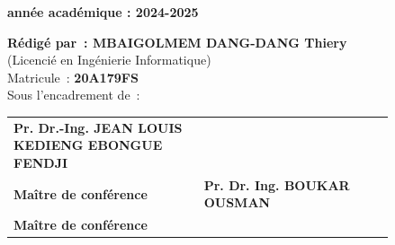 \begin{center}
	\textbf{année académique : 2024-2025}
\end{center}
\vspace{-1cm}

\begin{center}
	{\bfseries Rédigé par~: MBAIGOLMEM DANG-DANG Thiery} \\
	(Licencié en Ingénierie Informatique) \\
	Matricule~: {\bfseries 20A179FS} \\[0.6cm]
	Sous l'encadrement de~: \\[0.6cm]
	
	\setlength{\tabcolsep}{12pt} %
	\small
	\begin{tabular}{p{0.42\linewidth} p{0.42\linewidth}}
		\centering
		{\bfseries Pr. Dr.-Ing. JEAN LOUIS KEDIENG EBONGUE FENDJI} \\ 
		\textbf{Maître de conférence}
		 & 
		\centering
		{\bfseries Pr. Dr. Ing. BOUKAR OUSMAN}                     \\ 
		\textbf{Maître de conférence}
		
	\end{tabular}
\end{center}


\vfill

\begin{center}
\end{center}
